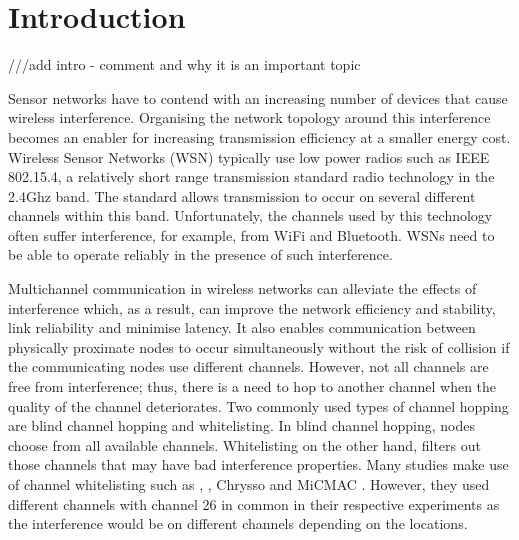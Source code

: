 \section{Introduction}
\label{sec:introduction}
///add intro - comment and why it is an important topic

Sensor networks have to contend with an increasing number of devices that cause wireless interference. Organising the network topology around this interference becomes an enabler for increasing transmission efficiency at a smaller energy cost. Wireless Sensor Networks (WSN) typically use low power radios such as IEEE 802.15.4, a relatively short range transmission standard radio technology in the 2.4Ghz band. The standard allows transmission to occur on several different channels within this band.  Unfortunately, the channels used by this technology often suffer interference, for example, from WiFi and Bluetooth. WSNs need to be able to operate reliably in the presence of such interference.  

Multichannel communication in wireless networks can alleviate the effects of interference which, as a result, can improve the network efficiency and stability, link reliability and minimise latency. It also enables communication between physically proximate nodes to occur simultaneously without the risk of collision if the communicating nodes use different channels. However, not all channels are free from interference; thus, there is a need to hop to another channel when the quality of the channel deteriorates. Two commonly used types of channel hopping \cite{watteyne} are blind channel hopping and whitelisting. In blind channel hopping, nodes choose from all available channels. Whitelisting on the other hand, filters out those channels that may have bad interference properties. Many studies make use of channel whitelisting such as \cite{watteyne}, \cite{wu}, Chrysso \cite{chrysso} and MiCMAC \cite{micmac}. However, they used different channels with channel 26 in common in their respective experiments as the interference would be on different channels depending on the locations. 

